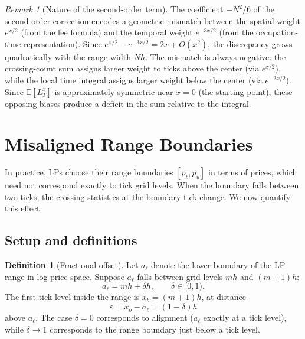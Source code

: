 \documentclass[11pt]{article}
\theoremstyle{definition}
\newtheorem{definition}[theorem]{Definition}
\theoremstyle{remark}
\newtheorem{remark}[theorem]{Remark}
\newcommand{\E}{\mathbb{E}}
\begin{document}
\begin{remark}[Nature of the second-order term]
The coefficient $-N^2/6$ of the second-order correction encodes a
geometric mismatch between the spatial weight
$e^{x/2}$ (from the fee formula) and the temporal weight
$e^{-3x/2}$ (from the occupation-time representation).
Since $e^{x/2} - e^{-3x/2} = 2x + O(x^2)$, the discrepancy grows
quadratically with the range width $Nh$. The mismatch is always
negative: the crossing-count sum assigns larger weight to ticks above
the center (via $e^{x/2}$), while the local time integral assigns
larger weight below the center (via $e^{-3x/2}$). Since $\E[L^x_T]$
is approximately symmetric near $x = 0$ (the starting point), these
opposing biases produce a deficit in the sum relative to the
integral.
\end{remark}

\section{Misaligned Range Boundaries}\label{sec:misaligned}

In practice, LPs choose their range boundaries $[p_\ell, p_u]$ in
terms of prices, which need not correspond exactly to tick grid
levels. When the boundary falls between two ticks, the crossing
statistics at the boundary tick change. We now quantify this effect.

\subsection{Setup and definitions}

\begin{definition}[Fractional offset]\label{def:offset}
Let $a_\ell$ denote the lower boundary of the LP range in log-price
space. Suppose $a_\ell$ falls between grid levels $mh$ and $(m+1)h$:
\begin{equation}\label{eq:offset}
a_\ell = mh + \delta h, \qquad \delta \in [0, 1).
\end{equation}
The first tick level inside the range is $x_b = (m+1)h$, at distance
\begin{equation}\label{eq:epsilon}
\varepsilon = x_b - a_\ell = (1 - \delta)h
\end{equation}
above $a_\ell$. The case $\delta = 0$ corresponds to alignment
($a_\ell$ exactly at a tick level), while $\delta \to 1$ corresponds
to the range boundary just below a tick level.
\end{definition}
\end{document}
